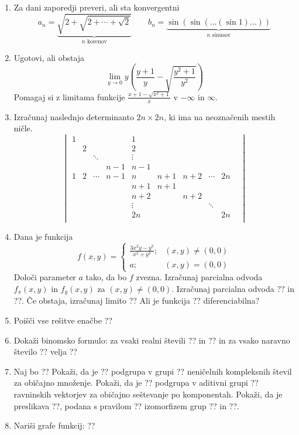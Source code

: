 \documentclass[a4paper,12pt]{article}
\begin{document}
\begin{enumerate}
\item Za dani zaporedji preveri, ali sta konvergentni
\[
    a_n=\underbrace{\sqrt{2+\sqrt{2+\cdots+\sqrt{2}}}}_{n \text{ korenov}}\qquad b_n=\underbrace{\sin{(\sin{(\dots(\sin{1})\dots)})}}_{n \text{  sinusov}}
\]

\item Ugotovi, ali obstaja
\[
\lim_{y\rightarrow 0}{y \left( \frac{y+1}{y}-\sqrt{\frac{y^2+1}{y^2}}\right)}    
\]
Pomagaj si z limitama funkcije $\frac{x+1-\sqrt{x^2 +1}}{x}$ v $-\infty$ in $\infty$.

\item Izračunaj naslednjo determinanto $2n\times 2n$, ki ima na neoznačenih mestih ničle.
\[
\begin{vmatrix}
1 & & & & 1 & & & & & \\
& 2 & & & 2 & & & & & \\
& & \ddots & & \vdots & & & & & \\
& & & n-1 & n-1 & & & & & \\
1 & 2 & \cdots & n-1 & n & n+1 & n+2 & \cdots & 2n \\
& & & & n+1 & n+1 & & & & \\
& & & & n+2 & & n+2 & & \\
& & & & \vdots & & & \ddots & \\
& & & & 2n & & & & 2n & \\

\end{vmatrix}
\]

\item Dana je funkcija
\[
 f(x,y)=
 \begin{cases}
    \frac{3x^2y-y^3}{x^2+y^2}; & (x,y)\ne (0,0) \\
    a; \quad & (x,y)=(0,0)
 \end{cases}
\]
Določi parameter $a$ tako, da bo $f$ zvezna.
Izračunaj parcialna odvoda $f_x(x,y)$ in $f_y(x,y)$ za $(x,y)\ne(0,0)$.
Izračunaj parcialna odvoda ?? in ??.
Če obstaja, izračunaj limito
??
Ali je funkcija ?? diferenciabilna?

\item Poišči vse rešitve enačbe
??

\item Dokaži binomsko formulo: za vsaki realni števili ?? in ?? in za vsako naravno število ?? velja
??

\item Naj bo
??
Pokaži, da je ?? podgrupa v grupi ??
neničelnih kompleksnih števil za običajno množenje.
Pokaži, da je ?? podgrupa v aditivni grupi ??
ravninskih vektorjev za običajno seštevanje po komponentah.
Pokaži, da je preslikava ??, podana s pravilom
??
izomorfizem grup ?? in ??.

\item Nariši grafe funkcij:
??

\end{enumerate}
\end{document}
